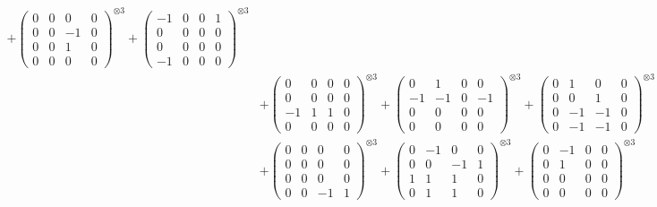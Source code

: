 \documentclass{article}
\begin{document}
{\begin{align}
            + \begin{pmatrix} 0 & 0 & 0 & 0 \\ 0 & 0 & -1 & 0 \\ 0 & 0 & 1 & 0 \\ 0 & 0 & 0 & 0 \end{pmatrix}^{\otimes 3} 
            + \begin{pmatrix} -1 & 0 & 0 & 1 \\ 0 & 0 & 0 & 0 \\ 0 & 0 & 0 & 0 \\ -1 & 0 & 0 & 0 \end{pmatrix}^{\otimes 3} \\
        &+ \label{Rs16-Rc11-Solution-4-c10} \begin{pmatrix} 0 & 0 & 0 & 0 \\ 0 & 0 & 0 & 0 \\ -1 & 1 & 1 & 0 \\ 0 & 0 & 0 & 0 \end{pmatrix}^{\otimes 3} 
            + \begin{pmatrix} 0 & 1 & 0 & 0 \\ -1 & -1 & 0 & -1 \\ 0 & 0 & 0 & 0 \\ 0 & 0 & 0 & 0 \end{pmatrix}^{\otimes 3} 
            + \begin{pmatrix} 0 & 1 & 0 & 0 \\ 0 & 0 & 1 & 0 \\ 0 & -1 & -1 & 0 \\ 0 & -1 & -1 & 0 \end{pmatrix}^{\otimes 3} \\
        &+ \label{Rs16-Rc11-Solution-4-c13} \begin{pmatrix} 0 & 0 & 0 & 0 \\ 0 & 0 & 0 & 0 \\ 0 & 0 & 0 & 0 \\ 0 & 0 & -1 & 1 \end{pmatrix}^{\otimes 3} 
            + \begin{pmatrix} 0 & -1 & 0 & 0 \\ 0 & 0 & -1 & 1 \\ 1 & 1 & 1 & 0 \\ 0 & 1 & 1 & 0 \end{pmatrix}^{\otimes 3} 
            + \begin{pmatrix} 0 & -1 & 0 & 0 \\ 0 & 1 & 0 & 0 \\ 0 & 0 & 0 & 0 \\ 0 & 0 & 0 & 0 \end{pmatrix}^{\otimes 3} \\

\end{align}}
\end{document}
